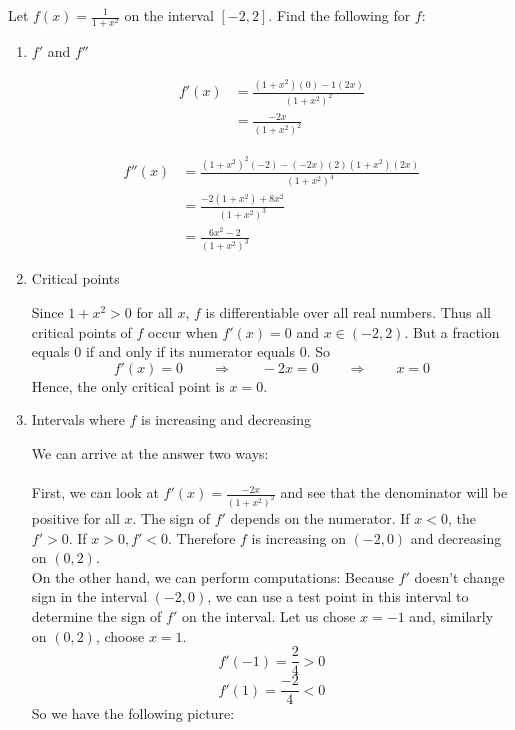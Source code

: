 \documentclass[nooutcomes]{ximera}
\begin{document}
\begin{problem}
\begin{enumerate}
	\end{enumerate}
	
\end{problem}


\begin{problem}
Let $f(x) = \frac{1}{1 + x^2}$ on the interval $[-2,2]$.  Find the following for $f$:

	\begin{enumerate}
	\item  $f'$ and $f''$
	
		\begin{freeResponse}
			\begin{align*}
			f'(x) &= \frac{(1+x^2)(0) - 1(2x)}{(1+x^2)^2} \\
			&= \frac{-2x}{(1+x^2)^2}
			\end{align*}
			
			\begin{align*}
			f''(x) &= \frac{(1+x^2)^2(-2) - (-2x)(2)(1+x^2)(2x)}{(1+x^2)^4} \\
			&= \frac{-2(1+x^2) + 8x^2}{(1+x^2)^3} \\
			&= \frac{6x^2 - 2}{(1+x^2)^3}
			\end{align*}
		\end{freeResponse}
	\item  Critical points
	
		\begin{freeResponse}
		Since $1+x^2 > 0$ for all $x$, $f$ is differentiable over all real numbers.  Thus all critical points of $f$ occur when $f'(x) = 0$ and $x \in (-2,2)$.  But a fraction equals 0 if and only if its numerator equals 0.  So
		$$ f'(x) = 0 \qquad \Longrightarrow \qquad -2x = 0 \qquad \Longrightarrow \qquad x=0 $$
		Hence, the only critical point is $x=0$.  
		\end{freeResponse}
	\item  Intervals where $f$ is increasing and decreasing
	
		\begin{freeResponse}
		We can arrive at the answer two ways: \\\\	
		First, we can look at $f'(x)= \frac{-2x}{(1+x^2)^2}$ and see that the denominator will be positive for all $x$.  The sign of $f'$ depends on the numerator.  If $x<0$, the $f'>0$.  If $x>0, f'<0$.   Therefore $f$ is increasing on $(-2,0)$ and decreasing on $(0,2)$.  \\
		
		On the other hand, we can perform computations: 
		Because $f'$ doesn’t change sign in the interval $(-2,0)$, we can use a test point in this interval to determine the sign of $f'$ on the interval.  Let us chose $x=-1$ and, similarly on $(0,2)$, choose $x=1$.
		$$ f'(-1) = \frac{2}{4} > 0 $$
		$$ f'(1) = \frac{-2}{4} < 0 $$
		So we have the following picture:
		

\end{freeResponse}
\end{enumerate}
\end{problem}
\end{document}
